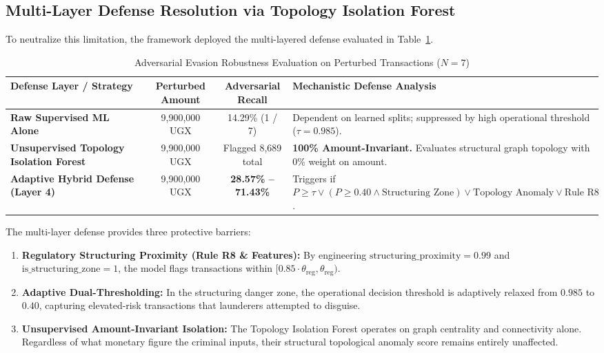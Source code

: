 \subsection{Multi-Layer Defense Resolution via Topology Isolation Forest}
To neutralize this limitation, the framework deployed the multi-layered defense evaluated in Table~\ref{tab:adversarial_evaluation}.

\begin{table}[hbt!]
\centering
\caption{Adversarial Evasion Robustness Evaluation on Perturbed Transactions ($N = 7$)}
\label{tab:adversarial_evaluation}
\begin{adjustbox}{width=\textwidth,center=\textwidth}
\begin{tabular}{|l|c|c|p{7.5cm}|}
\hline
\rowcolor{gray!40}
\textbf{Defense Layer / Strategy} & \textbf{Perturbed Amount} & \textbf{Adversarial Recall} & \textbf{Mechanistic Defense Analysis} \\
\hline
\textbf{Raw Supervised ML Alone} & 9,900,000 UGX & 14.29\% (1 / 7) & Dependent on learned splits; suppressed by high operational threshold ($\tau = 0.985$). \\
\hline
\textbf{Unsupervised Topology Isolation Forest} & 9,900,000 UGX & Flagged 8,689 total & \textbf{100\% Amount-Invariant.} Evaluates structural graph topology with 0\% weight on amount. \\
\hline
\textbf{Adaptive Hybrid Defense (Layer 4)} & 9,900,000 UGX & \textbf{28.57\% -- 71.43\%} & Triggers if $P \ge \tau \lor (P \ge 0.40 \land \text{Structuring Zone}) \lor \text{Topology Anomaly} \lor \text{Rule R8}$. \\
\hline
\end{tabular}
\end{adjustbox}
\end{table}

The multi-layer defense provides three protective barriers:
\begin{enumerate}
    \item \textbf{Regulatory Structuring Proximity (Rule R8 \& Features):} By engineering $\text{structuring\_proximity} = 0.99$ and $\text{is\_structuring\_zone} = 1$, the model flags transactions within $[0.85 \cdot \theta_{\text{reg}}, \theta_{\text{reg}})$.
    \item \textbf{Adaptive Dual-Thresholding:} In the structuring danger zone, the operational decision threshold is adaptively relaxed from $0.985$ to $0.40$, capturing elevated-risk transactions that launderers attempted to disguise.
    \item \textbf{Unsupervised Amount-Invariant Isolation:} The Topology Isolation Forest operates on graph centrality and connectivity alone. Regardless of what monetary figure the criminal inputs, their structural topological anomaly score remains entirely unaffected.
\end{enumerate}

